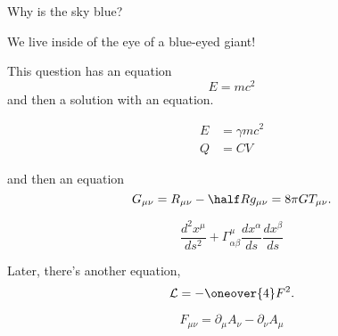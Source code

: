 \question  Why is the sky blue?

\begin{solution}
	We live inside of the eye of a blue-eyed giant!
\end{solution}

\question This question has an equation
\begin{equation}
	E=mc^2
\end{equation}
and then a solution with an equation.
\begin{solution}
	\begin{align}
		E&=\gamma mc^2	\\
		Q&=CV
	\end{align}
\end{solution}
and then an equation
\begin{equation}
	G_{\mu\nu} = R_{\mu\nu}-\half R g_{\mu\nu} = 8\pi G T_{\mu\nu}.
\end{equation}
\begin{solution}
	\begin{equation}
		\frac{d^2 x^\mu}{ds^2} + \Gamma^{\mu}_{\alpha\beta} \frac{dx^\alpha}{ds} \frac{dx^\beta}{ds}
	\end{equation}
\end{solution}

\question Later, there's another equation,
\begin{equation}
	\mathcal{L} = - \oneover{4} F^2.
\end{equation}
\begin{solution}
	\begin{equation}
		F_{\mu\nu} = \partial_\mu A_\nu - \partial_\nu A_\mu
	\end{equation}
\end{solution}
